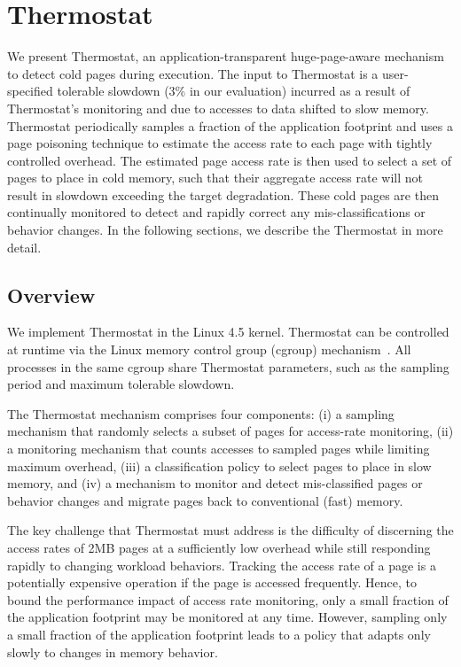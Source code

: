\section{Thermostat}
\label{proposal}

We present Thermostat, an application-transparent huge-page-aware mechanism to
detect cold pages during execution. The input to Thermostat is a user-specified
tolerable slowdown (3\% in our evaluation) incurred as a result of Thermostat's 
monitoring and due to accesses to data shifted to slow memory. Thermostat periodically
samples a fraction of the application footprint and uses a page poisoning technique
to estimate the access rate to each page with tightly controlled overhead. The
estimated page access rate is then used to select a set of pages to
place in cold memory, such that their aggregate access rate will not result in 
slowdown exceeding the target
degradation.  These cold pages are then continually monitored to
detect and rapidly correct any mis-classifications or behavior changes.
In the following sections, we describe the Thermostat in more detail.

\subsection{Overview}
We implement Thermostat in the Linux 4.5 kernel. Thermostat can be controlled at
runtime via the Linux memory control group (cgroup) mechanism~\cite{cgroups}.
All processes in the same cgroup share Thermostat parameters, such as the
sampling period and maximum tolerable slowdown.

The Thermostat mechanism comprises four components: (i) a sampling mechanism
that randomly selects a subset of pages for access-rate monitoring, (ii) a monitoring
mechanism that counts accesses to sampled pages while limiting maximum overhead, 
(iii) a classification policy to select pages to place in slow memory, and
(iv) a mechanism to monitor and detect mis-classified pages or behavior changes and migrate 
pages back to conventional (fast) memory.

The key challenge that Thermostat must address is the difficulty of discerning the access 
rates of 2MB pages at a sufficiently low overhead while still responding rapidly
to changing workload behaviors. Tracking the access rate of a page
is a potentially expensive operation if the page is accessed frequently.  
Hence, to bound the performance impact of
access rate monitoring, only a small fraction of the application footprint may be
monitored at any time.  However, sampling only a small fraction of the application
footprint leads to a policy that adapts only slowly to changes in memory behavior.

